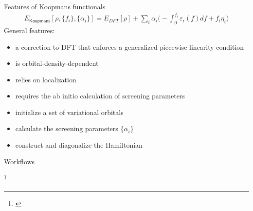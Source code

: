 \documentclass[xcolor=table,aspectratio=169]{beamer}
\newcommand\blfootcite[1]{%
  \begingroup
  \renewcommand\thefootnote{}\footnote{\hspace{-4ex}\cite{#1}}%
  \addtocounter{footnote}{-1}%
  \endgroup
}
\numberwithin{equation}{section}
\begin{document}
\begin{frame}{Features of Koopmans functionals}
   \begin{align*}
      E_\mathsf{Koopmans}[\rho,{\{f_i\}}, {\{\alpha_i\}}]
      = {E_{DFT}[\rho]}
      + \sum_i
      {\alpha_i}
      \Biggl(
      -
         {\int^{f_i}_{0} \varepsilon_i(f) df}
      +
         {f_i {\eta_i}}
      \Biggr)
   \end{align*}
   General features:
   \begin{itemize}[<+(1)->]
      \item a correction to DFT that enforces a generalized piecewise linearity condition
      \item is orbital-density-dependent
      \item relies on localization
      \item requires the ab initio calculation of screening parameters
   \end{itemize}
   
   \begin{itemize}[<+(1)->]
      \item initialize a set of variational orbitals
      \item calculate the screening parameters $\{\alpha_i\}$
      \item construct and diagonalize the Hamiltonian
   \end{itemize}
\end{frame}

\begin{frame}{Workflows}

   \vspace{-1.5ex}

   \vspace{2ex}

   \blfootcite{Linscott2023}

\end{frame}
\end{document}
